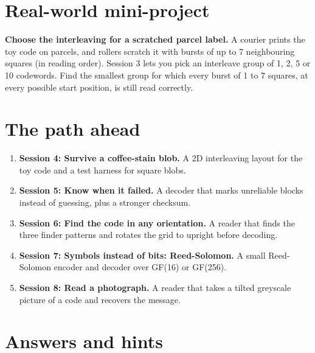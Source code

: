 \documentclass[11pt,a4paper]{article}
\begin{document}
\section{Real-world mini-project}
\textbf{Choose the interleaving for a scratched parcel label.} A courier prints the toy code on parcels, and rollers scratch it with bursts of up to 7 neighbouring squares (in reading order). Session 3 lets you pick an interleave group of 1, 2, 5 or 10 codewords. Find the smallest group for which every burst of 1 to 7 squares, at every possible start position, is still read correctly.

\section{The path ahead}
\begin{enumerate}[nosep]
\item \textbf{Session 4: Survive a coffee-stain blob.} A 2D interleaving layout for the toy code and a test harness for square blobs.
\item \textbf{Session 5: Know when it failed.} A decoder that marks unreliable blocks instead of guessing, plus a stronger checksum.
\item \textbf{Session 6: Find the code in any orientation.} A reader that finds the three finder patterns and rotates the grid to upright before decoding.
\item \textbf{Session 7: Symbols instead of bits: Reed-Solomon.} A small Reed-Solomon encoder and decoder over GF(16) or GF(256).
\item \textbf{Session 8: Read a photograph.} A reader that takes a tilted greyscale picture of a code and recovers the message.
\end{enumerate}

\section{Answers and hints}
\end{document}
